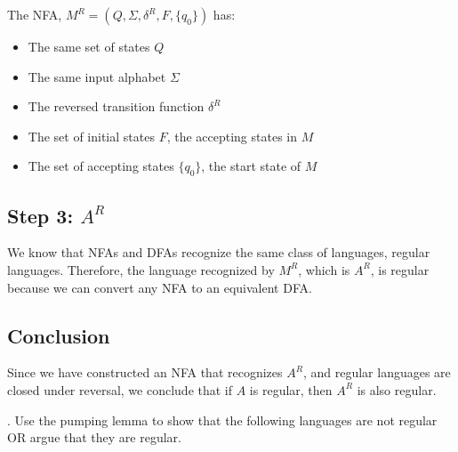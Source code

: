 \documentclass[12pt]{article}
\newcounter{quesnum}
\newcommand{\question}[2][??]{
\begin{list}{\labelitemi}{\leftmargin=2em}
\item [\arabic{quesnum}.] {} {#2}
\end{list}
\addtocounter{quesnum}{1}
}
\begin{document}
The NFA, \( M^R = (Q, \Sigma, \delta^R, F, \{q_0\}) \) has:
\begin{itemize}
    \item The same set of states \( Q \)
    \item The same input alphabet \( \Sigma \)
    \item The reversed transition function \( \delta^R \)
    \item The set of initial states \( F \), the accepting states in \( M \)
    \item The set of accepting states \( \{q_0\} \), the start state of \( M \)
\end{itemize}

\subsection*{Step 3: \( A^R \)}
We know that NFAs and DFAs recognize the same class of languages, regular languages. Therefore, the language recognized by \( M^R \), which is \( A^R \), is regular because we can convert any NFA to an equivalent DFA.

\subsection*{Conclusion}
Since we have constructed an NFA that recognizes \( A^R \), and regular languages are closed under reversal, we conclude that if \( A \) is regular, then \( A^R \) is also regular.

\vspace{12pt}

\question[3]{
Use the pumping lemma to show that the following languages are not regular OR argue that they are regular. 
}
\end{document}

